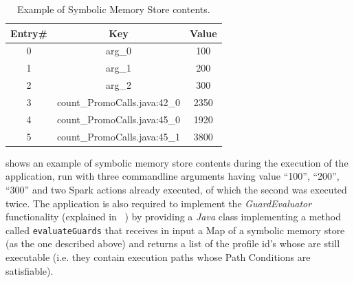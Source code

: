 \begin{table}[tbhp]
	\centering
	\caption{Example of Symbolic Memory Store contents.}
	\label{Table:impl_symbolic_memory_store_contents}
	\begin{tabular}{|c|c|c|}
		\hline
		\textbf{Entry\#} & \textbf{Key} & \textbf{Value} \\ \hline
		0	& arg\_0						&  100      \\ \hline
		1	& arg\_1						&  200      \\ \hline
		2	& arg\_2						&  300      \\ \hline
		3	& count\_PromoCalls.java:42\_0	& 2350      \\ \hline
		4	& count\_PromoCalls.java:45\_0	& 1920      \\ \hline
		5	& count\_PromoCalls.java:45\_1	& 3800      \\ \hline
	\end{tabular}
\end{table}
 shows an example of symbolic memory store contents during the execution of the application, run with three commandline arguments having value “100”, “200”, “300” and two Spark actions already executed, of which the second was executed twice.
The application is also required to implement the \textit{GuardEvaluator} functionality (explained in ~) by providing a \textit{Java} class implementing a method called \texttt{evaluateGuards} that receives in input a Map of a symbolic memory store (as the one described above) and returns a list of the profile id’s whose \plans are still executable (i.e. they contain execution paths whose Path Conditions are satisfiable).

